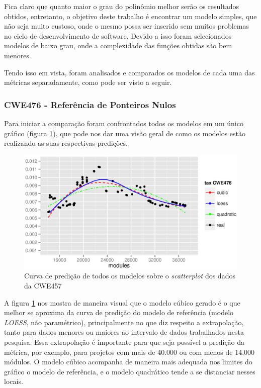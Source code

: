Fica claro que quanto maior o grau do polinômio melhor serão os resultados
obtidos, entretanto, o objetivo deste trabalho é encontrar um modelo simples,
que não seja muito custoso, onde o mesmo possa ser inserido sem muitos problemas
no ciclo de desenvolvimento de software. Devido a isso foram selecionados
modelos de baixo grau, onde a complexidade das funções obtidas são bem menores.

Tendo isso em vista, foram analisados e comparados os modelos de cada uma das
métricas separadamente, como pode ser visto a seguir.

\subsubsection{CWE476 - Referência de Ponteiros Nulos}

Para iniciar a comparação foram confrontados todos os modelos em um único
gráfico (figura \ref{fig:cwe476-all-models}), que pode nos dar uma visão geral de
como os modelos estão realizando as suas respectivas predições.

\begin{figure}[h]
  \centering
  \includegraphics[width=1.0\textwidth]
      {figuras/cwe476-all-models.eps}
      \caption{Curva de predição de todos os modelos sobre o \textit{scatterplot}
      dos dados da CWE457}
  \label{fig:cwe476-all-models}
\end{figure}

A figura \ref{fig:cwe476-all-models} nos mostra de maneira visual que o modelo
cúbico gerado é o que melhor se aproxima da curva de predição do modelo de
referência (modelo \textit{LOESS}, não paramétrico), principalmente no que diz
respeito a extrapolação, tanto para dados menores ou maiores ao intervalo de
dados trabalhados nesta pesquisa. Essa extrapolação é importante para que seja
possível a predição da métrica, por exemplo, para projetos com mais de 40.000 ou
com menos de 14.000 módulos. O modelo cúbico acompanha de maneira mais adequada
nos limites do gráfico o modelo de referência, e o modelo quadrático tende a se
distanciar nesses locais.

